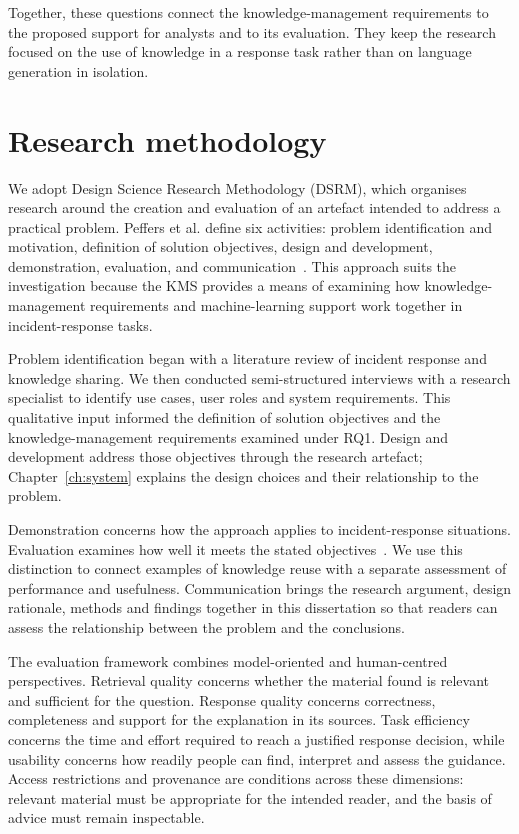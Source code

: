 Together, these questions connect the knowledge-management requirements to the proposed support for analysts and to its evaluation. They keep the research focused on the use of knowledge in a response task rather than on language generation in isolation.

\section{Research methodology}
We adopt Design Science Research Methodology (DSRM), which organises research around the creation and evaluation of an artefact intended to address a practical problem. Peffers et al. define six activities: problem identification and motivation, definition of solution objectives, design and development, demonstration, evaluation, and communication~\cite{peffers2007}. This approach suits the investigation because the KMS provides a means of examining how knowledge-management requirements and machine-learning support work together in incident-response tasks.

Problem identification began with a literature review of incident response and knowledge sharing. We then conducted semi-structured interviews with a research specialist to identify use cases, user roles and system requirements. This qualitative input informed the definition of solution objectives and the knowledge-management requirements examined under RQ1. Design and development address those objectives through the research artefact; Chapter~\ref{ch:system} explains the design choices and their relationship to the problem.

Demonstration concerns how the approach applies to incident-response situations. Evaluation examines how well it meets the stated objectives~\cite{peffers2007}. We use this distinction to connect examples of knowledge reuse with a separate assessment of performance and usefulness. Communication brings the research argument, design rationale, methods and findings together in this dissertation so that readers can assess the relationship between the problem and the conclusions.

The evaluation framework combines model-oriented and human-centred perspectives. Retrieval quality concerns whether the material found is relevant and sufficient for the question. Response quality concerns correctness, completeness and support for the explanation in its sources. Task efficiency concerns the time and effort required to reach a justified response decision, while usability concerns how readily people can find, interpret and assess the guidance. Access restrictions and provenance are conditions across these dimensions: relevant material must be appropriate for the intended reader, and the basis of advice must remain inspectable.

